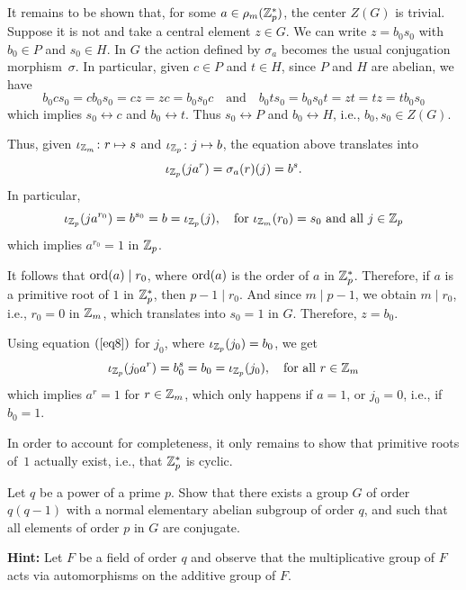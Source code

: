 \begin{solution}
It remains to be shown that, for some $a\in\rho_m(\mathbb{Z}_p^*)$, the center $Z(G)$ is trivial. Suppose it is not and take a central element $z\in G$. We can write $z=b_0s_0$ with $b_0\in P$ and $s_0\in H$. In $G$ the action defined by $\sigma_a$ becomes the usual conjugation morphism~$\sigma$. In particular, given $c\in P$ and $t\in H$, since $P$ and $H$ are abelian, we have
$$
    b_0cs_0 = cb_0s_0 = cz = zc = b_0s_0c
        \quad\text{and}\quad b_0ts_0 = b_0s_0t = zt = tz = tb_0s_0
$$
which implies $s_0\leftrightarrow c$ and $b_0\leftrightarrow t$. Thus $s_0\leftrightarrow P$ and $b_0\leftrightarrow H$, i.e., $b_0,s_0\in Z(G)$.

Thus, given $\iota_{\mathbb{Z}_m}\colon r\mapsto s$ and $\iota_{\mathbb{Z}_p}\colon j\mapsto b$, the equation above translates into
\begin{equation}\label{eq8}
    \iota_{\mathbb{Z}_p}(ja^r) = \sigma_a(r)(j) = b^s.
\end{equation}
In particular,
$$
    \iota_{\mathbb{Z}_p}(ja^{r_0}) = b^{s_0} = b = \iota_{\mathbb{Z}_p}(j),
        \quad\text{for }\iota_{\mathbb{Z}_m}(r_0)=s_0\text{ and all }j\in\mathbb{Z}_p 
$$
which implies $a^{r_0}=1$ in $\mathbb{Z}_p$.

It follows that ${\rm ord}(a)\mid r_0$, where ${\rm ord}(a)$ is the order of $a$ in $\mathbb{Z}_p^*$. Therefore, if $a$ is a primitive root of $1$ in $\mathbb{Z}_p^*$, then $p-1\mid r_0$. And since $m\mid p-1$, we obtain $m\mid r_0$, i.e., $r_0=0$ in $\mathbb{Z}_m$, which translates into $s_0=1$ in $G$. Therefore, $z=b_0$.

Using equation $(\ref{eq8})$ for $j_0$, where $\iota_{\mathbb{Z}_p}(j_0)=b_0$, we get
$$
    \iota_{\mathbb{Z}_p}(j_0a^r)=b_0^s=b_0 = \iota_{\mathbb{Z}_p}(j_0),
        \quad\text{for all }r\in\mathbb{Z}_m
$$
which implies $a^r=1$ for $r\in\mathbb{Z}_m$, which only happens if $a=1$, or $j_0=0$, i.e., if $b_0=1$.

In order to account for completeness, it only remains to show that primitive roots of~$1$ actually exist, i.e., that $\mathbb{Z}_p^*$ is cyclic.

\end{solution}


\begin{probl}
    Let\/ $q$ be a power of a prime\/ $p$. Show that there exists a group\/ $G$ of order\/ $q(q-1)$ with a normal elementary abelian subgroup of order\/ $q$, and such that all elements of order\/ $p$ in\/ $G$ are conjugate.

    \textrm{\normalfont\textbf{Hint:} Let $F$ be a field of order $q$ and observe that the multiplicative group of $F$ acts via automorphisms on the additive group of $F$.}
\end{probl}


